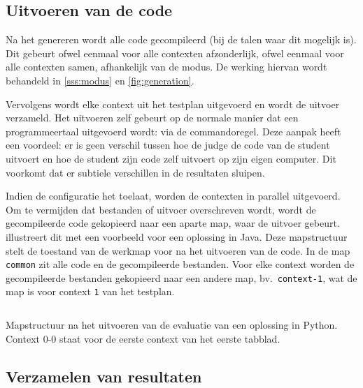 \subsection{Uitvoeren van de code}\label{subsec:uitvoeren-van-de-code}

Na het genereren wordt alle code gecompileerd (bij de talen waar dit mogelijk is).
Dit gebeurt ofwel eenmaal voor alle contexten afzonderlijk, ofwel eenmaal voor alle contexten samen, afhankelijk van de modus.
De werking hiervan wordt behandeld in \cref{sss:modus} en \cref{fig:generation}.

Vervolgens wordt elke context uit het testplan uitgevoerd en wordt de uitvoer verzameld.
Het uitvoeren zelf gebeurt op de normale manier dat een programmeertaal uitgevoerd wordt: via de commandoregel.
Deze aanpak heeft een voordeel: er is geen verschil tussen hoe de judge de code van de student uitvoert en hoe de student zijn code zelf uitvoert op zijn eigen computer.
Dit voorkomt dat er subtiele verschillen in de resultaten sluipen.

Indien de configuratie het toelaat, worden de contexten in parallel uitgevoerd.
Om te vermijden dat bestanden of uitvoer overschreven wordt, wordt de gecompileerde code gekopieerd naar een aparte map, waar de uitvoer gebeurt.
 illustreert dit met een voorbeeld voor een oplossing in Java.
Deze mapstructuur stelt de toestand van de werkmap voor na het uitvoeren van de code.
In de map \texttt{common} zit alle code en de gecompileerde bestanden.
Voor elke context worden de gecompileerde bestanden gekopieerd naar een andere map, bv.\ \texttt{context-1}, wat de map is voor context \texttt{1} van het testplan.

\begin{listing}
    \inputminted{text}{code/dir-listing.txt}
    \caption{Mapstructuur na het uitvoeren van de evaluatie van een oplossing in Python.
    Context 0-0 staat voor de eerste context van het eerste tabblad.}
    \label{lst:mapstructuur}
\end{listing}

\subsection{Verzamelen van resultaten}\label{subsec:verzamelen-van-resultaten}

